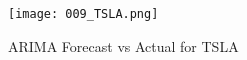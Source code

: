 \documentclass{article}
\begin{document}
\begin{figure}[h]
\centering
\texttt{[image: 009\_TSLA.png]}
\caption{ARIMA Forecast vs Actual for TSLA}
\label{fig:TSLA_forecast}
\end{figure}
\end{document}
